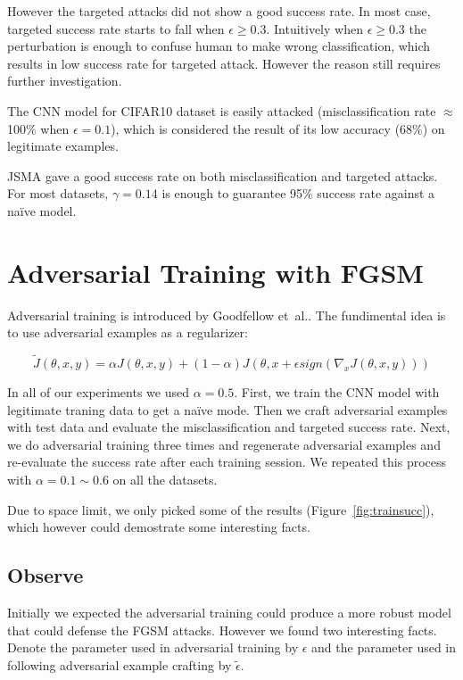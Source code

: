 \documentclass{article}
\begin{document}
However the targeted attacks did not show a good success rate. In most case, targeted success rate starts to fall when \(\epsilon\geq 0.3\).
Intuitively when \(\epsilon\geq 0.3\) the perturbation is enough to confuse human to make wrong classification,
which results in low success rate for targeted attack. However the reason still requires further investigation.

The CNN model for CIFAR10 dataset is easily attacked (misclassification rate $\approx$ 100\% when \(\epsilon=0.1\)),
which is considered the result of its low accuracy (68\%) on legitimate examples.

JSMA gave a good success rate on both misclassification and targeted attacks. 
For most datasets, \(\gamma=0.14\) is enough to guarantee 95\% success rate against a na\"ive model.

\section{Adversarial Training with FGSM}

Adversarial training is introduced by Goodfellow et\ al.\cite{goodfellow2015}. The fundimental idea is to use adversarial examples as a regularizer:

\[ \tilde{J}(\theta, x, y) = \alpha J(\theta, x, y) + (1 - \alpha)J(\theta, x + \epsilon sign(\nabla_xJ(\theta, x, y))) \]

In all of our experiments we used $\alpha=0.5$. First, we train the CNN model with legitimate traning data to get a na\"ive mode.
Then we craft adversarial examples with test data and evaluate the misclassification and targeted success rate.
Next, we do adversarial training three times and regenerate adversarial examples and re-evaluate the success rate after each training session.
We repeated this process with $\alpha=0.1\sim 0.6$ on all the datasets.

Due to space limit, we only picked some of the results (Figure~\ref{fig:trainsucc}), which however could demostrate some interesting facts.

\subsection{Observe}

Initially we expected the adversarial training could produce a more robust model that could defense the FGSM attacks. However we found two interesting facts.
Denote the parameter used in adversarial training by $\epsilon$ and the parameter used in following adversarial example crafting by $\tilde{\epsilon}$.
\end{document}
